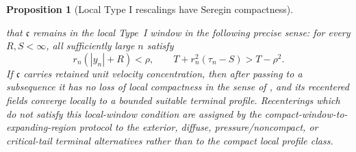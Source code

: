 \documentclass[11pt]{amsart}
\numberwithin{equation}{section}
\theoremstyle{plain}
\newtheorem{proposition}[proposition]{Proposition}
\theoremstyle{definition}
\theoremstyle{remark}
\begin{document}
\begin{proposition}[Local Type I rescalings have Seregin compactness]
\begin{enumerate}[label=\textup{(\roman*)}]
that \(\mathfrak c\) remains in the local Type~I window in the following
precise sense: for every \(R,S<\infty\), all sufficiently large \(n\) satisfy
\[
   r_n(|y_n|+R)<\rho,
   \qquad
   T+r_n^2(\tau_n-S)>T-\rho^2 .
\]
If \(\mathfrak c\) carries retained unit velocity concentration, then after
passing to a subsequence it has no loss of local compactness in the sense of
, and its recentered fields converge locally to a
bounded suitable terminal profile.  Recenterings which do not satisfy this
local-window condition are assigned by the compact-window-to-expanding-region
protocol to the exterior, diffuse, pressure/noncompact, or critical-tail
terminal alternatives rather than to the compact local profile class.
\end{enumerate}
\end{proposition}
\end{document}
